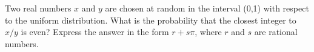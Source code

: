 Two real numbers $x$ and $y$ are chosen at random in the interval (0,1)
with respect to the uniform distribution. What is the probability that
the closest integer to $x/y$ is even? Express the answer in the form
$r+s\pi$, where $r$ and $s$ are rational numbers.
